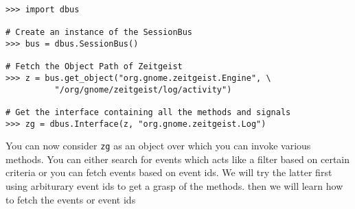 \begin{center}
\begin{verbatim}
>>> import dbus

# Create an instance of the SessionBus
>>> bus = dbus.SessionBus()

# Fetch the Object Path of Zeitgeist
>>> z = bus.get_object("org.gnome.zeitgeist.Engine", \
          "/org/gnome/zeitgeist/log/activity")

# Get the interface containing all the methods and signals
>>> zg = dbus.Interface(z, "org.gnome.zeitgeist.Log")
\end{verbatim}
\end{center}

You can now consider \texttt{zg} as an object over which you can invoke various 
methods. You can either search for events which acts like a filter based on certain 
criteria or you can fetch events based on event ids. We will try the latter first 
using arbiturary event ids to get a grasp of the methods. then we will learn how to 
fetch the events or event ids

